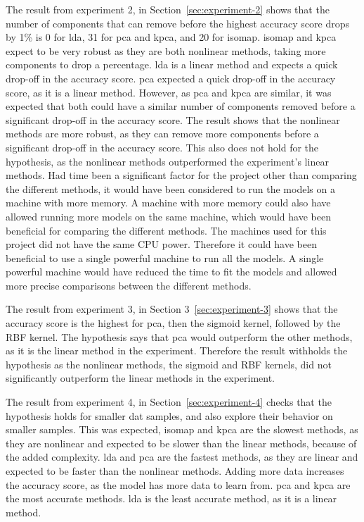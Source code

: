 The result from experiment 2, in Section~\ref{sec:experiment-2} shows that the number of components that can remove before the highest accuracy score drops by 1\% is 0 for \gls{lda}, 31 for \gls{pca} and \gls{kpca}, and 20 for \gls{isomap}. \gls{isomap} and \gls{kpca} expect to be very robust as they are both nonlinear methods, taking more components to drop a percentage. \gls{lda} is a linear method and expects a quick drop-off in the accuracy score. \gls{pca} expected a quick drop-off in the accuracy score, as it is a linear method. However, as \gls{pca} and \gls{kpca} are similar, it was expected that both could have a similar number of components removed before a significant drop-off in the accuracy score. The result shows that the nonlinear methods are more robust, as they can remove more components before a significant drop-off in the accuracy score. This also does not hold for the hypothesis, as the nonlinear methods outperformed the experiment's linear methods. Had time been a significant factor for the project other than comparing the different methods, it would have been considered to run the models on a machine with more memory. A machine with more memory could also have allowed running more models on the same machine, which would have been beneficial for comparing the different methods. The machines used for this project did not have the same CPU power. Therefore it could have been beneficial to use a single powerful machine to run all the models. A single powerful machine would have reduced the time to fit the models and allowed more precise comparisons between the different methods.

The result from experiment 3, in Section 3~\ref{sec:experiment-3} shows that the accuracy score is the highest for \gls{pca}, then the sigmoid kernel, followed by the RBF kernel. The hypothesis says that \gls{pca} would outperform the other methods, as it is the linear method in the experiment. Therefore the result withholds the hypothesis as the nonlinear methods, the sigmoid and RBF kernels, did not significantly outperform the linear methods in the experiment. 

The result from experiment 4, in Section~\ref{sec:experiment-4} checks that the hypothesis holds for smaller dat samples, and also explore their behavior on smaller samples. This was expected, \gls{isomap} and \gls{kpca} are the slowest methods, as they are nonlinear and expected to be slower than the linear methods, because of the added complexity. \gls{lda} and \gls{pca} are the fastest methods, as they are linear and expected to be faster than the nonlinear methods. Adding more data increases the accuracy score, as the model has more data to learn from. \gls{pca} and \gls{kpca} are the most accurate methods. \gls{lda} is the least accurate method, as it is a linear method.

